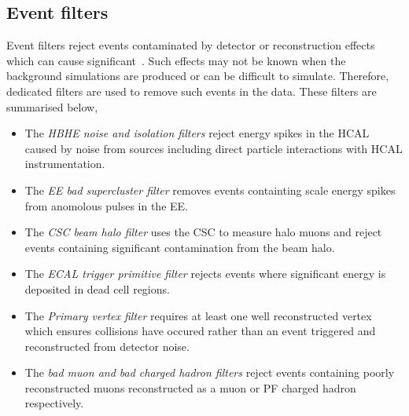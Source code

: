 \subsection{Event filters}
Event filters reject events contaminated by detector or reconstruction effects
which can cause significant~\met. Such effects may not be known when the 
background simulations are produced or can be difficult to simulate. Therefore,
dedicated filters are used to remove such events in the data. These \met filters are summarised below,

\begin{itemize}
\item The \emph{HBHE noise and isolation filters} reject energy spikes in the HCAL caused by noise from sources 
including direct particle interactions with HCAL instrumentation.
\item The \emph{EE bad supercluster filter} removes events containting \TeV scale energy spikes from anomolous
pulses in the EE.
\item The \emph{CSC beam halo filter} uses the CSC to measure halo muons and reject events containing 
significant contamination from the beam halo.
\item The \emph{ECAL trigger primitive filter} rejects events where significant energy is deposited in dead cell regions.
\item The \emph{Primary vertex filter} requires at least one well reconstructed vertex which ensures collisions have occured
rather than an event triggered and reconstructed from detector noise.
\item The \emph{bad muon and bad charged hadron filters} reject events containing poorly reconstructed muons reconstructed as 
a muon or PF charged hadron respectively.
\end{itemize}

